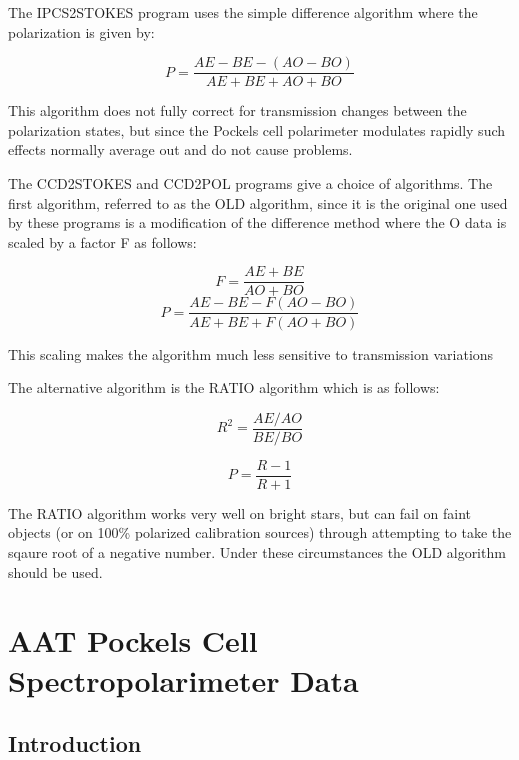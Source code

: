 The IPCS2STOKES program uses the simple difference algorithm where the
polarization is given by:

\begin{equation}
P = \frac{AE-BE-(AO-BO)}{AE+BE+AO+BO}
\end{equation}

This algorithm does not fully correct for transmission changes between the
polarization states, but since the Pockels cell polarimeter modulates rapidly
such effects normally average out and do not cause problems.

The CCD2STOKES and CCD2POL programs give a choice of algorithms. The first
algorithm, referred to as the OLD algorithm, since it is the original one used
by these programs is a modification of the difference method where the O data
is scaled by a factor F as follows:

\begin{equation}
F = \frac{AE+BE}{AO+BO}
\end{equation}
\begin{equation}
P = \frac{AE-BE-F(AO-BO)}{AE+BE+F(AO+BO)}
\end{equation}

This scaling makes the algorithm much less sensitive to transmission variations

The alternative algorithm is the RATIO algorithm which is as follows:

\begin{equation}
R^2 = \frac{AE/AO}{BE/BO}
\end{equation}

\begin{equation}
P = \frac{R-1}{R+1}
\end{equation}

The RATIO algorithm works very well on bright stars, but can fail on faint objects
(or on 100\% polarized calibration sources) through attempting to take the
sqaure root of a negative number. Under these circumstances the OLD algorithm
should be used.

\section{AAT Pockels Cell Spectropolarimeter Data}

\subsection{Introduction}

